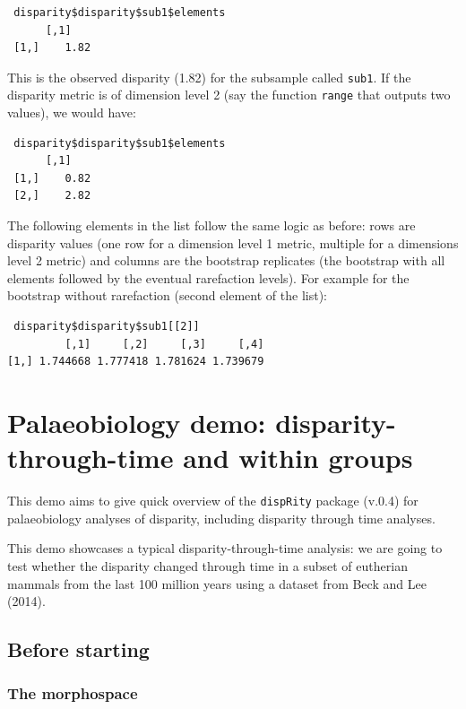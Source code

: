 \documentclass[]{book}
\theoremstyle{definition}
\theoremstyle{definition}
\theoremstyle{remark}
\begin{document}
\begin{verbatim}
 disparity$disparity$sub1$elements
      [,1]
 [1,]    1.82
\end{verbatim}

This is the observed disparity (1.82) for the subsample called
\texttt{sub1}. If the disparity metric is of dimension level 2 (say the
function \texttt{range} that outputs two values), we would have:

\begin{verbatim}
 disparity$disparity$sub1$elements
      [,1]
 [1,]    0.82
 [2,]    2.82
\end{verbatim}

The following elements in the list follow the same logic as before: rows
are disparity values (one row for a dimension level 1 metric, multiple
for a dimensions level 2 metric) and columns are the bootstrap
replicates (the bootstrap with all elements followed by the eventual
rarefaction levels). For example for the bootstrap without rarefaction
(second element of the list):

\begin{verbatim}
 disparity$disparity$sub1[[2]]
         [,1]     [,2]     [,3]     [,4]
[1,] 1.744668 1.777418 1.781624 1.739679 
\end{verbatim}

\chapter{Palaeobiology demo: disparity-through-time and within
groups}\label{palaeobiology-demo-disparity-through-time-and-within-groups}

This demo aims to give quick overview of the \texttt{dispRity} package
(v.0.4) for palaeobiology analyses of disparity, including disparity
through time analyses.

This demo showcases a typical disparity-through-time analysis: we are
going to test whether the disparity changed through time in a subset of
eutherian mammals from the last 100 million years using a dataset from
Beck and Lee (2014).

\section{Before starting}\label{before-starting}

\subsection{The morphospace}\label{the-morphospace}
\end{document}
